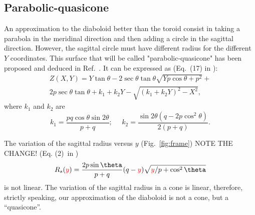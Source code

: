 \documentclass{iucr}              %
\newcommand{\inred}[1]{{\color{red}#1}}
\begin{document}




\subsection{Parabolic-\inred{quasi}cone}\label{sec:quasicone}
An approximation to the diaboloid better than the toroid consist in taking a parabola in the meridinal direction and then adding a circle in the sagittal direction. However, the sagittal circle must have different radius for the different $Y$ coordinates. This surface that will be called "parabolic-\inred{quasi}cone" has been proposed and deduced in Ref.~\cite{Valeriy2020c}. It can be expressed as (Eq.~(17) in \cite{Valeriy2020c}):
\begin{multline}
\label{eqn:parabolicCone}
Z(X,Y) = Y \tan\theta - 2 \sec\theta \tan\theta
\sqrt{Y p \cos\theta + p^2} + \\
2 p \sec\theta \tan\theta +
k_1 + k_2 Y - \sqrt{(k_1 + k_2 Y)^2 - X^2},
\end{multline}
where $k_1$ and $k_2$ are
\begin{equation}
k_1 = \frac{p q \cos\theta \sin2\theta}{p+q};~~~~~~
k_2 = \frac{\sin2\theta(q-2p\cos^2\theta)}{2(p+q)}.
\end{equation}

The variation of the sagittal radius versus \inred{$y$ (Fig.~\ref{fig:frame}) NOTE THE CHANGE!}  (Eq. (2)\ in \cite{Valeriy2020c} )
\begin{equation}
\label{eq:sagRadiusApprox}
R_s(\inred{y}) = \frac{2  p \sin\theta}{p + q} (q - \inred{y})   \sqrt{\inred{y} / p + \cos^2\theta}
\end{equation}
is not linear. The variation of the sagittal radius in a cone is linear, therefore, strictly speaking, our approximation of the diaboloid is not a cone\inred{, but a ``quasicone''}. 
\end{document}
